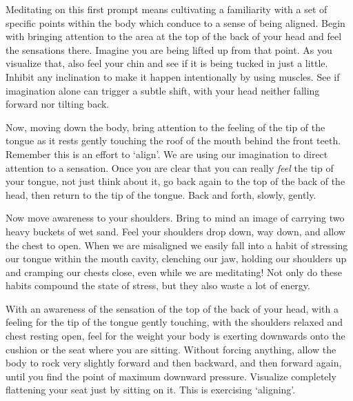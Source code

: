 Meditating on this first prompt means cultivating a familiarity with a
set of specific points within the body which conduce to a sense of being
aligned. Begin with bringing attention to the area at the top of the
back of your head and feel the sensations there. Imagine you are being
lifted up from that point. As you visualize that, also feel your chin
and see if it is being tucked in just a little. Inhibit any inclination
to make it happen intentionally by using muscles. See if imagination
alone can trigger a subtle shift, with your head neither falling forward
nor tilting back.

Now, moving down the body, bring attention to the feeling of the tip of
the tongue as it rests gently touching the roof of the mouth behind the
front teeth. Remember this is an effort to `align'. We are using our
imagination to direct attention to a sensation. Once you are clear that
you can really \emph{feel} the tip of your tongue, not just think about
it, go back again to the top of the back of the head, then return to the
tip of the tongue. Back and forth, slowly, gently.

Now move awareness to your shoulders. Bring to mind an image of carrying
two heavy buckets of wet sand. Feel your shoulders drop down, way down,
and allow the chest to open. When we are misaligned we easily fall into
a habit of stressing our tongue within the mouth cavity, clenching our
jaw, holding our shoulders up and cramping our chests close, even while
we are meditating! Not only do these habits compound the state of
stress, but they also waste a lot of energy.

With an awareness of the sensation of the top of the back of your head,
with a feeling for the tip of the tongue gently touching, with the
shoulders relaxed and chest resting open, feel for the weight your body
is exerting downwards onto the cushion or the seat where you are
sitting. Without forcing anything, allow the body to rock very slightly
forward and then backward, and then forward again, until you find the
point of maximum downward pressure. Visualize completely flattening your
seat just by sitting on it. This is exercising `aligning'.


